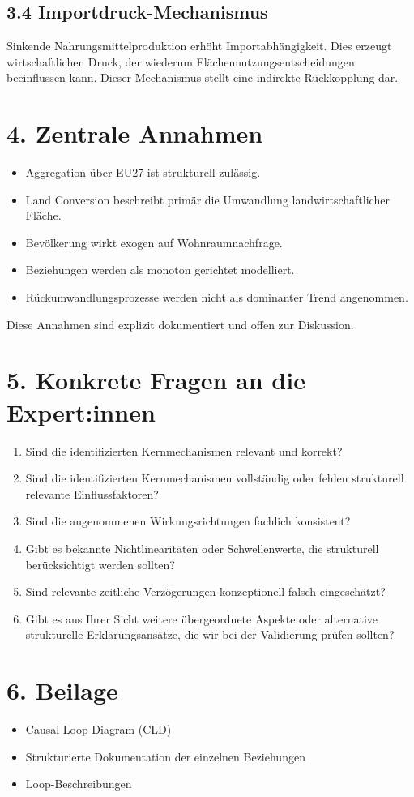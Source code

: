 \documentclass[10pt, a4paper]{article}
\begin{document}
\subsection*{3.4 Importdruck-Mechanismus}
Sinkende Nahrungsmittelproduktion erhöht Importabhängigkeit. Dies erzeugt wirtschaftlichen Druck, der wiederum Flächennutzungsentscheidungen beeinflussen kann. Dieser Mechanismus stellt eine indirekte Rückkopplung dar.

\section*{4. Zentrale Annahmen}
\begin{itemize}[itemsep=0pt, leftmargin=*]
    \item Aggregation über EU27 ist strukturell zulässig.
    \item Land Conversion beschreibt primär die Umwandlung landwirtschaftlicher Fläche.
    \item Bevölkerung wirkt exogen auf Wohnraumnachfrage.
    \item Beziehungen werden als monoton gerichtet modelliert.
    \item Rückumwandlungsprozesse werden nicht als dominanter Trend angenommen.
\end{itemize}
Diese Annahmen sind explizit dokumentiert und offen zur Diskussion.

\section*{5. Konkrete Fragen an die Expert:innen}
\begin{enumerate}[itemsep=2pt, leftmargin=*]
    \item Sind die identifizierten Kernmechanismen relevant und korrekt?
    \item Sind die identifizierten Kernmechanismen vollständig oder fehlen strukturell relevante Einflussfaktoren?
    \item Sind die angenommenen Wirkungsrichtungen fachlich konsistent?
    \item Gibt es bekannte Nichtlinearitäten oder Schwellenwerte, die strukturell berücksichtigt werden sollten?
    \item Sind relevante zeitliche Verzögerungen konzeptionell falsch eingeschätzt?
    \item Gibt es aus Ihrer Sicht weitere übergeordnete Aspekte oder alternative strukturelle Erklärungsansätze, die wir bei der Validierung prüfen sollten?
\end{enumerate}

\section*{6. Beilage}
\begin{itemize}[itemsep=0pt, leftmargin=*]
    \item Causal Loop Diagram (CLD)
    \item Strukturierte Dokumentation der einzelnen Beziehungen
    \item Loop-Beschreibungen
\end{itemize}
\end{document}

